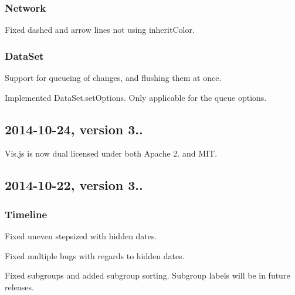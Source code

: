 \subsubsection*{Network}


\begin{DoxyItemize}
\item Fixed dashed and arrow lines not using inherit\+Color.
\end{DoxyItemize}

\subsubsection*{Data\+Set}


\begin{DoxyItemize}
\item Support for queueing of changes, and flushing them at once.
\item Implemented {\ttfamily Data\+Set.\+set\+Options}. Only applicable for the {\ttfamily queue} options.
\end{DoxyItemize}

\subsection*{2014-\/10-\/24, version 3..}


\begin{DoxyItemize}
\item Vis.\+js is now dual licensed under both Apache 2. and M\+IT.
\end{DoxyItemize}

\subsection*{2014-\/10-\/22, version 3..}

\subsubsection*{Timeline}


\begin{DoxyItemize}
\item Fixed uneven stepsized with hidden dates.
\item Fixed multiple bugs with regards to hidden dates.
\item Fixed subgroups and added subgroup sorting. Subgroup labels will be in future releases.
\end{DoxyItemize}

